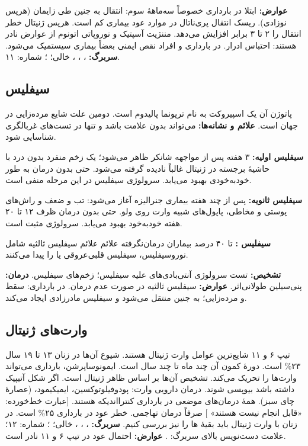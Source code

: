 \documentclass[12pt,a4paper]{article}
\begin{document}
\textbf{عوارض:}
ابتلا در بارداری خصوصاً سه‌ماههٔ سوم: انتقال به جنین طی زایمان (هرپس نوزادی).
ریسک انتقال پری‌ناتال در موارد عود بیماری کم است.
هرپس ژنیتال خطر انتقال  را ۲ تا ۳ برابر افزایش می‌دهد.
مننژیت آسپتیک و نوروپاتی اتونوم از عوارض نادر هستند: احتباس ادرار.
در بارداری و افراد نقص ایمنی بعضاً بیماری سیستمیک می‌شود.
\textbf{سربرگ:} ، ، ،  خالی؛ ؛ شماره: ۱۱.
\subsection*{سیفلیس}
پاتوژن آن یک اسپیروکت به نام ترپونما پالیدوم است.
دومین علت شایع مرده‌زایی در جهان است.
\textbf{علائم و نشانه‌ها:} می‌تواند بدون علامت باشد و تنها در تست‌های غربالگری شناسایی شود.

\textbf{سیفلیس اولیه:} ۳ هفته پس از مواجهه شانکر ظاهر می‌شود؛ یک زخم منفرد بدون درد با حاشیهٔ برجسته در ژنیتال غالباً نادیده گرفته می‌شود.
حتی بدون درمان به طور خودبه‌خودی بهبود می‌یابد. سرولوژی سیفلیس در این مرحله منفی است.

\textbf{سیفلیس ثانویه:} پس از چند هفته بیماری جنرالیزه آغاز می‌شود: تب و ضعف و راش‌های پوستی و مخاطی، پاپول‌های شبیه وارت روی ولو.
حتی بدون درمان ظرف ۱۲ تا ۲۰ هفته خودبه‌خود بهبود می‌یابد. سرولوژی مثبت است.

\textbf{سیفلیس :} تا ۴۰ درصد بیماران درمان‌نگرفته علائم علائم سیفلیس ثالثیه شامل نوروسیفلیس، سیفلیس قلبی‌عروقی یا  را پیدا می‌کنند.

\textbf{تشخیص:} تست سرولوژی آنتی‌بادی‌های علیه سیفلیس؛  زخم‌های سیفلیس.
\textbf{درمان:} پنی‌سیلین طولانی‌اثر.
\textbf{عوارض:} سیفلیس ثالثیه در صورت عدم درمان.
در بارداری: سقط و مرده‌زایی؛ به جنین منتقل می‌شود و سیفلیس مادرزادی ایجاد می‌کند.
\subsection*{وارت‌های ژنیتال}
 تیپ ۶ و ۱۱ شایع‌ترین عوامل وارت ژنیتال هستند.
شیوع آن‌ها در زنان ۱۳ تا ۱۹ سال ۲۳\% است.
دورهٔ کمون آن چند ماه تا چند سال است.
ایمونوساپرشن، بارداری می‌تواند وارت‌ها را تحریک می‌کند.
تشخیص آن‌ها بر اساس ظاهر ژنیتال است. اگر شکل آتیپیک داشته باشد بیوپسی شوند.
درمان دارویی وارت: پودوفیلوتوکسین، ایمیکیمود،  (عصارهٔ چای سبز).
همهٔ درمان‌های موضعی در بارداری کنترااندیکه هستند. [عبارت خط‌خورده: «قابل انجام نیست هستند» ] صرفاً درمان تهاجمی.
خطر عود در بارداری ۲۵\% است.
در زنان با وارت ژنیتال باید بقیهٔ ها را نیز بررسی کنیم.
\textbf{سربرگ:} ، ، ،  خالی؛ ؛ شماره: ۱۲؛ علامت دست‌نویس بالای سربرگ: .
\textbf{عوارض:} احتمال عود در تیپ ۶ و ۱۱ نادر است.
\end{document}
